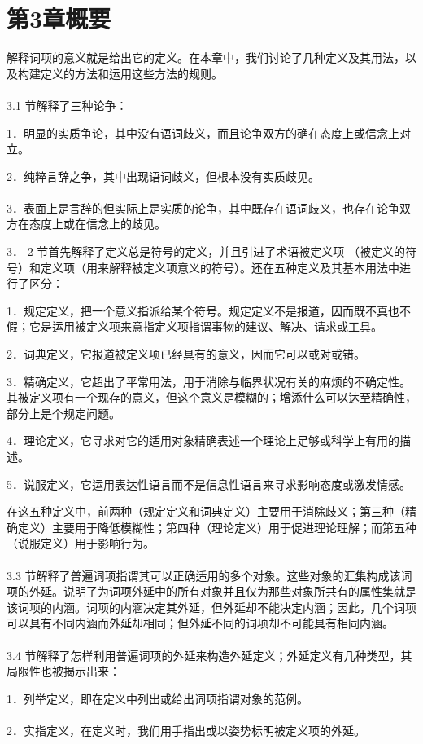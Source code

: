 \section*{第3章概要}
解释词项的意义就是给出它的定义。在本章中，我们讨论了几种定义及其用法，以及构建定义的方法和运用这些方法的规则。\\\\
3.1 节解释了三种论争：

1．明显的实质争论，其中没有语词歧义，而且论争双方的确在态度上或信念上对立。

2．纯粹言辞之争，其中出现语词歧义，但根本没有实质歧见。\\\\
3．表面上是言辞的但实际上是实质的论争，其中既存在语词歧义，也存在论争双方在态度上或在信念上的歧见。

3． 2 节首先解释了定义总是符号的定义，并且引进了术语被定义项 （被定义的符号）和定义项（用来解释被定义项意义的符号）。还在五种定义及其基本用法中进行了区分：

1．规定定义，把一个意义指派给某个符号。规定定义不是报道，因而既不真也不假；它是运用被定义项来意指定义项指谓事物的建议、解决、请求或工具。

2．词典定义，它报道被定义项已经具有的意义，因而它可以或对或错。

3．精确定义，它超出了平常用法，用于消除与临界状况有关的麻烦的不确定性。其被定义项有一个现存的意义，但这个意义是模糊的；增添什么可以达至精确性，部分上是个规定问题。

4．理论定义，它寻求对它的适用对象精确表述一个理论上足够或科学上有用的描述。

5．说服定义，它运用表达性语言而不是信息性语言来寻求影响态度或激发情感。

在这五种定义中，前两种（规定定义和词典定义）主要用于消除歧义；第三种（精确定义）主要用于降低模糊性；第四种（理论定义）用于促进理论理解；而第五种（说服定义）用于影响行为。\\\\
3.3 节解释了普遍词项指谓其可以正确适用的多个对象。这些对象的汇集构成该词项的外延。说明了为词项外延中的所有对象并且仅为那些对象所共有的属性集就是该词项的内涵。词项的内涵决定其外延，但外延却不能决定内涵；因此，几个词项可以具有不同内涵而外延却相同；但外延不同的词项却不可能具有相同内涵。\\\\
3.4 节解释了怎样利用普遍词项的外延来构造外延定义；外延定义有几种类型，其局限性也被揭示出来：

1．列举定义，即在定义中列出或给出词项指谓对象的范例。\\\\
2．实指定义，在定义时，我们用手指出或以姿势标明被定义项的外延。

